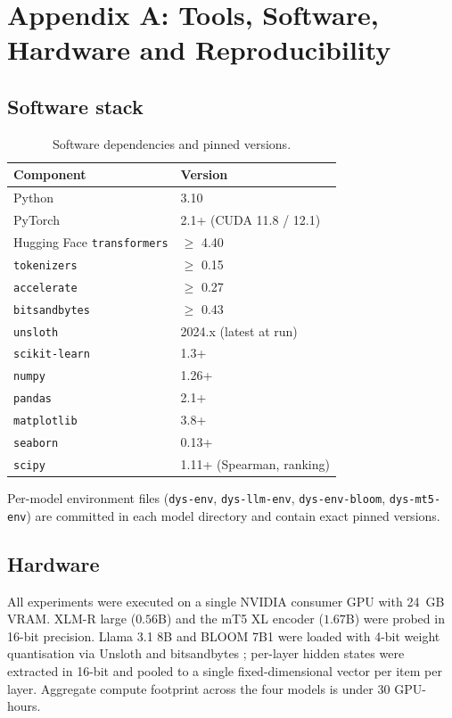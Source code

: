 \chapter*{Appendix A: Tools, Software, Hardware and Reproducibility}

\section*{Software stack}

\begin{table}[H]
\centering
\small
\renewcommand{\arraystretch}{1.5}
\begin{tabularx}{\textwidth}{|L|L|}
\hline
\textbf{Component} & \textbf{Version} \\
\hline
Python & 3.10 \\
\hline
PyTorch & 2.1+ (CUDA 11.8 / 12.1) \\
\hline
Hugging Face \texttt{transformers} & $\geq$ 4.40 \\
\hline
\texttt{tokenizers} & $\geq$ 0.15 \\
\hline
\texttt{accelerate} & $\geq$ 0.27 \\
\hline
\texttt{bitsandbytes} & $\geq$ 0.43 \\
\hline
\texttt{unsloth} & 2024.x (latest at run) \\
\hline
\texttt{scikit-learn} & 1.3+ \\
\hline
\texttt{numpy} & 1.26+ \\
\hline
\texttt{pandas} & 2.1+ \\
\hline
\texttt{matplotlib} & 3.8+ \\
\hline
\texttt{seaborn} & 0.13+ \\
\hline
\texttt{scipy} & 1.11+ (Spearman, ranking) \\
\hline
\end{tabularx}
\caption{Software dependencies and pinned versions.}
\end{table}

Per-model environment files (\texttt{dys-env}, \texttt{dys-llm-env}, \texttt{dys-env-bloom}, \texttt{dys-mt5-env}) are committed in each model directory and contain exact pinned versions.

\section*{Hardware}

All experiments were executed on a single NVIDIA consumer GPU with 24~GB VRAM. XLM-R large ($0.56$B) and the mT5 XL encoder ($1.67$B) were probed in 16-bit precision. Llama 3.1 8B and BLOOM 7B1 were loaded with 4-bit weight quantisation via Unsloth and bitsandbytes \cite{dettmers2022bnb}; per-layer hidden states were extracted in 16-bit and pooled to a single fixed-dimensional vector per item per layer. Aggregate compute footprint across the four models is under 30 GPU-hours.

